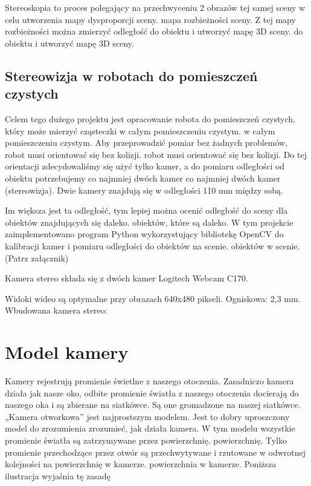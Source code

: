 \documentclass[magisterska]{pracadypl}
\begin{document}
Stereoskopia to proces polegający na przechwyceniu 2 obrazów tej samej sceny w celu utworzenia mapy dysproporcji sceny.
mapa rozbieżności sceny. Z tej mapy rozbieżności można zmierzyć odległość do obiektu i utworzyć mapę 3D sceny.
do obiektu i utworzyć mapę 3D sceny.

\subsection{Stereowizja w robotach do pomieszczeń czystych}

Celem tego dużego projektu jest opracowanie robota do pomieszczeń czystych, który może mierzyć cząsteczki w całym pomieszczeniu czystym.
w całym pomieszczeniu czystym. Aby przeprowadzić pomiar bez żadnych problemów, robot musi orientować się bez kolizji.
robot musi orientować się bez kolizji. Do tej orientacji zdecydowaliśmy się użyć tylko
kamer, a do pomiaru odległości od obiektu potrzebujemy co najmniej dwóch kamer
co najmniej dwóch kamer (stereowizja). Dwie kamery znajdują się w odległości 110
mm między sobą.

Im większa jest ta odległość, tym lepiej można ocenić odległość do sceny dla obiektów znajdujących się daleko.
obiektów, które są daleko.
W tym projekcie zaimplementowano program Python wykorzystujący bibliotekę OpenCV
do kalibracji kamer i pomiaru odległości do obiektów na scenie.
obiektów w scenie. (Patrz załącznik)

Kamera stereo składa się z dwóch kamer Logitech Webcam C170.

Widoki wideo są optymalne przy obrazach 640x480 pikseli. Ogniskowa: 2,3 mm.
Wbudowana kamera stereo:

\section{Model kamery}

Kamery rejestrują promienie świetlne z naszego otoczenia. Zasadniczo kamera działa jak
nasze oko, odbite promienie światła z naszego otoczenia docierają do naszego oka i są zbierane na siatkówce.
Są one gromadzone na naszej siatkówce.
„Kamera otworkowa” jest najprostszym modelem. Jest to dobry uproszczony model do zrozumienia
zrozumieć, jak działa kamera. W tym modelu wszystkie promienie światła są zatrzymywane przez powierzchnię.
powierzchnię. Tylko promienie przechodzące przez otwór są przechwytywane i rzutowane w odwrotnej kolejności na powierzchnię w kamerze.
powierzchnia w kamerze. Poniższa ilustracja wyjaśnia tę zasadę
\end{document}
